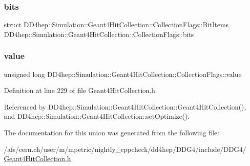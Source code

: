 \subsubsection{\texorpdfstring{bits}{bits}}
{\footnotesize\ttfamily struct \hyperlink{struct_d_d4hep_1_1_simulation_1_1_geant4_hit_collection_1_1_collection_flags_1_1_bit_items}{D\+D4hep\+::\+Simulation\+::\+Geant4\+Hit\+Collection\+::\+Collection\+Flags\+::\+Bit\+Items}                     D\+D4hep\+::\+Simulation\+::\+Geant4\+Hit\+Collection\+::\+Collection\+Flags\+::bits}

\hypertarget{union_d_d4hep_1_1_simulation_1_1_geant4_hit_collection_1_1_collection_flags_a41662e93df084e0be2823219e1b09934}{}\label{union_d_d4hep_1_1_simulation_1_1_geant4_hit_collection_1_1_collection_flags_a41662e93df084e0be2823219e1b09934} 
\subsubsection{\texorpdfstring{value}{value}}
{\footnotesize\ttfamily unsigned long D\+D4hep\+::\+Simulation\+::\+Geant4\+Hit\+Collection\+::\+Collection\+Flags\+::value}



Definition at line 229 of file Geant4\+Hit\+Collection.\+h.



Referenced by D\+D4hep\+::\+Simulation\+::\+Geant4\+Hit\+Collection\+::\+Geant4\+Hit\+Collection(), and D\+D4hep\+::\+Simulation\+::\+Geant4\+Hit\+Collection\+::set\+Optimize().



The documentation for this union was generated from the following file\+:\begin{DoxyCompactItemize}
\item 
/afs/cern.\+ch/user/m/mpetric/nightly\+\_\+cppcheck/dd4hep/\+D\+D\+G4/include/\+D\+D\+G4/\hyperlink{_geant4_hit_collection_8h}{Geant4\+Hit\+Collection.\+h}\end{DoxyCompactItemize}
